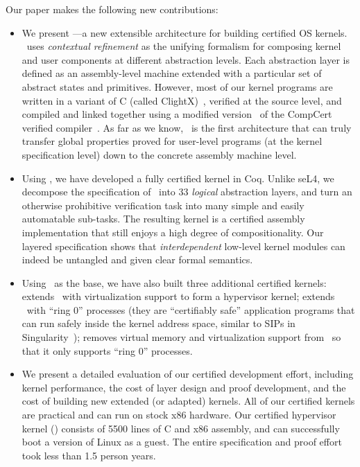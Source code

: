 {Our paper makes the following new contributions:
\begin{itemize} \itemsep 0pt
\item We present {\bf{}\CTOS}---a new extensible architecture for
  building certified OS kernels. \CTOS\ uses {\em contextual
    refinement} as the unifying formalism for composing kernel and
  user components at different abstraction levels.  Each abstraction
  layer is defined as an assembly-level machine extended with a
  particular set of abstract states and primitives.  However, most of
  our kernel programs are written in a variant of C (called
  ClightX)~\cite{dscal15}, verified at the source level, and compiled
  and linked together using a modified version~\cite{dscal15} of the
  CompCert verified compiler~\cite{compcert,leroy09}.  As far as we
  know, \CTOS\ is the first architecture that can truly transfer
  global properties proved for user-level programs (at the kernel
  specification level) down to the concrete assembly machine level.
\item Using \CTOS, we have developed a fully certified
  {\bf \mCTOS} kernel in Coq. Unlike seL4, 
  we decompose the specification of \mCTOS\ 
  into 33 {\em logical} abstraction layers, and turn an otherwise 
  prohibitive verification task into many simple and easily automatable 
  sub-tasks. The resulting kernel is a certified assembly implementation 
  that still enjoys a high degree of compositionality.
  Our layered specification shows that
  {\em interdependent} low-level kernel modules can indeed be
  untangled and given clear formal semantics.
\item Using \mCTOS\ as the base, we have also built three additional
  certified kernels: {\bf{}\mCTOShyper} extends \mCTOS\ with virtualization
  support to form a hypervisor kernel;
  {\bf{}\mCTOSringz} extends \mCTOShyper\ with ``ring 0'' processes
  (they are ``certifiably safe'' application programs that can run safely 
  inside the kernel address space, similar to SIPs in 
  Singularity~\cite{hunt07}); {\bf{}\mCTOSembed} removes virtual memory
  and virtualization support from \mCTOSringz\ so that it only supports 
  ``ring 0'' processes.
\item We present a detailed evaluation of our certified development
  effort, including kernel performance, the cost of
  layer design and proof development,
  and the cost of building new extended (or adapted)
  kernels. All of our certified kernels are practical and can run on stock
  x86 hardware. Our certified hypervisor kernel (\mCTOShyper) consists
  of 5500 lines of C and x86 assembly, and can successfully boot 
  a version of Linux as a guest. The entire specification and proof effort 
  took less than 1.5 person years. 
\end{itemize}

}
